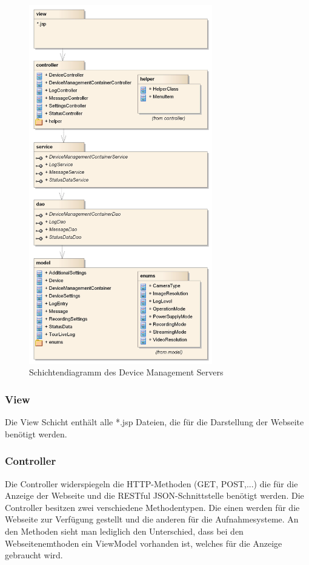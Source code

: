\label{fig:devmgmtsrvschichten}
\begin{figure}[H]
	\centering
	\includegraphics[width=80mm]{images/devmgmtsrv/schichten.jpg}
	\caption{Schichtendiagramm des Device Management Servers}
\end{figure}

\subsubsection{View}
Die View Schicht enthält alle *.jsp Dateien, die für die Darstellung der Webseite benötigt werden. 

\subsubsection{Controller}
Die Controller widerspiegeln die HTTP-Methoden (GET, POST,...) die für die Anzeige der Webseite und die RESTful JSON-Schnittstelle benötigt werden. Die Controller besitzen zwei verschiedene Methodentypen. Die einen werden für die Webseite zur Verfügung gestellt und die anderen für die Aufnahmesysteme. An den Methoden sieht man lediglich den Unterschied, dass bei den Webseitenemthoden ein ViewModel vorhanden ist, welches für die Anzeige gebraucht wird.

